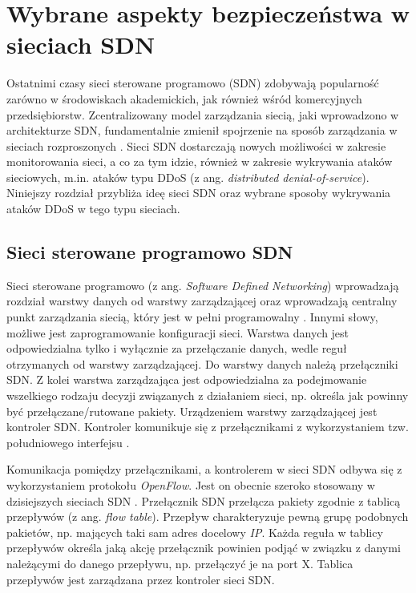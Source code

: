 \chapter{Wybrane aspekty bezpieczeństwa w sieciach SDN }

Ostatnimi czasy sieci sterowane programowo (SDN) zdobywają popularność zarówno
w środowiskach akademickich, jak również wśród komercyjnych przedsiębiorstw.
Zcentralizowany model zarządzania siecią, jaki wprowadzono w architekturze SDN,
fundamentalnie zmienił spojrzenie na sposób zarządzania w sieciach rozproszonych
\cite{ddosNYarticle}. Sieci SDN dostarczają nowych możliwości w zakresie
monitorowania sieci, a co za tym idzie, również w zakresie wykrywania ataków
sieciowych, m.in. ataków typu DDoS (z ang. \textit{distributed
  denial-of-service}). Niniejszy rozdział przybliża ideę sieci SDN oraz wybrane
sposoby wykrywania ataków DDoS w tego typu sieciach. 

\section{Sieci sterowane programowo SDN}
Sieci sterowane programowo (z ang. \textit{Software Defined Networking})
wprowadzają rozdział warstwy danych od warstwy zarządzającej oraz wprowadzają
centralny punkt zarządzania siecią, który jest w pełni programowalny \cite{onf}.
Innymi słowy, możliwe jest zaprogramowanie konfiguracji sieci. Warstwa danych
jest odpowiedzialna tylko i wyłącznie za przełączanie danych, wedle reguł
otrzymanych od warstwy zarządzającej. Do warstwy danych należą przełączniki SDN.
Z kolei warstwa zarządzająca jest odpowiedzialna za podejmowanie wszelkiego
rodzaju decyzji związanych z działaniem sieci, np. określa jak powinny być
przełączane/rutowane pakiety. Urządzeniem warstwy zarządzającej jest kontroler
SDN. Kontroler komunikuje się z przełącznikami z wykorzystaniem tzw.
południowego interfejsu \cite{sdninterfaces}.

Komunikacja pomiędzy przełącznikami, a kontrolerem w sieci SDN odbywa się z
wykorzystaniem protokołu \textit{OpenFlow}. Jest on obecnie szeroko stosowany w
dzisiejszych sieciach SDN \cite{ddoskoreaarticle}. Przełącznik SDN przełącza
pakiety zgodnie z tablicą przepływów (z ang. \textit{flow table}). Przepływ
charakteryzuje pewną grupę podobnych pakietów, np. mających taki sam adres
docelowy \textit{IP}. Każda reguła w tablicy przepływów określa jaką akcję
przełącznik powinien podjąć w związku z danymi należącymi do danego
przepływu, np. przełączyć je na port X. Tablica przepływów jest zarządzana przez
kontroler sieci SDN.

